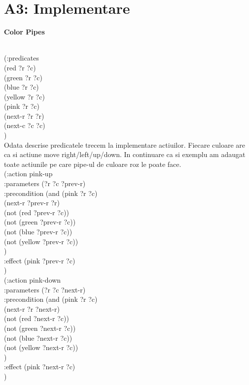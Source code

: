 \documentclass[a4paper,12pt]{report}
\begin{document}
\chapter{A3: Implementare}

%
\begin{Large}
 \textbf{Color Pipes}\\
\end{Large}\\

 (:predicates\\
   (red ?r ?c)\\
   (green ?r ?c)\\
   (blue ?r ?c)\\
   (yellow ?r ?c)\\
   (pink ?r ?c)\\
   (next-r ?r ?r)\\
   (next-c ?c ?c)\\
  )\\
  Odata descrise predicatele trecem la implementare actiuilor. Fiecare culoare are ca si actiune move right/left/up/down. In continuare ca si exemplu am adaugat toate actiunile pe care pipe-ul de culoare roz le poate face.\\

(:action pink-up\\
    :parameters (?r ?c ?prev-r)\\
    :precondition (and (pink ?r ?c)\\
    			       (next-r ?prev-r ?r)\\
    			       (not (red ?prev-r ?c))\\
                       (not (green ?prev-r ?c))\\
                       (not (blue ?prev-r ?c))\\
                       (not (yellow ?prev-r ?c))\\
                )\\
    :effect (pink ?prev-r ?c)\\
  )\\

  (:action pink-down\\
    :parameters (?r ?c ?next-r)\\
    :precondition (and (pink ?r ?c)\\
    			       (next-r ?r ?next-r)\\
    			       (not (red ?next-r ?c))\\
                       (not (green ?next-r ?c))\\
                       (not (blue ?next-r ?c))\\
                       (not (yellow ?next-r ?c))\\
                )\\
    :effect (pink ?next-r ?c)\\
  )
  
\end{document}
